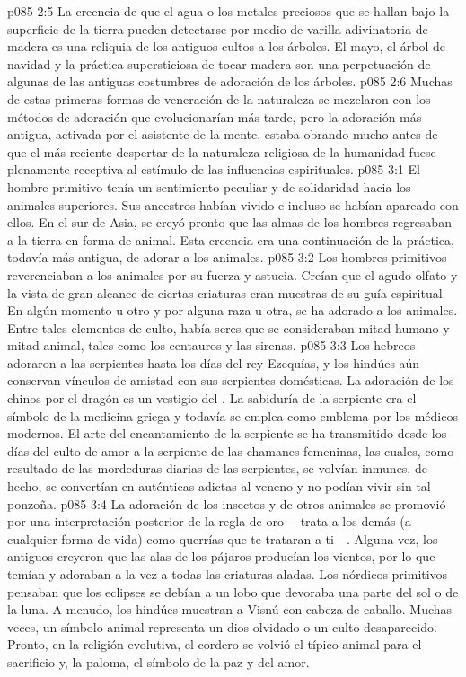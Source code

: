 \vs p085 2:5 La creencia de que el agua o los metales preciosos que se hallan bajo la superficie de la tierra pueden detectarse por medio de varilla adivinatoria de madera es una reliquia de los antiguos cultos a los árboles. El mayo, el árbol de navidad y la práctica supersticiosa de tocar madera son una perpetuación de algunas de las antiguas costumbres de adoración de los árboles.
\vs p085 2:6 Muchas de estas primeras formas de veneración de la naturaleza se mezclaron con los métodos de adoración que evolucionarían más tarde, pero la adoración más antigua, activada por el asistente de la mente, estaba obrando mucho antes de que el más reciente despertar de la naturaleza religiosa de la humanidad fuese plenamente receptiva al estímulo de las influencias espirituales.
\vs p085 3:1 El hombre primitivo tenía un sentimiento peculiar y de solidaridad hacia los animales superiores. Sus ancestros habían vivido e incluso se habían apareado con ellos. En el sur de Asia, se creyó pronto que las almas de los hombres regresaban a la tierra en forma de animal. Esta creencia era una continuación de la práctica, todavía más antigua, de adorar a los animales.
\vs p085 3:2 Los hombres primitivos reverenciaban a los animales por su fuerza y astucia. Creían que el agudo olfato y la vista de gran alcance de ciertas criaturas eran muestras de su guía espiritual. En algún momento u otro y por alguna raza u otra, se ha adorado a los animales. Entre tales elementos de culto, había seres que se consideraban mitad humano y mitad animal, tales como los centauros y las sirenas.
\vs p085 3:3 Los hebreos adoraron a las serpientes hasta los días del rey Ezequías, y los hindúes aún conservan vínculos de amistad con sus serpientes domésticas. La adoración de los chinos por el dragón es un vestigio del . La sabiduría de la serpiente era el símbolo de la medicina griega y todavía se emplea como emblema por los médicos modernos. El arte del encantamiento de la serpiente se ha transmitido desde los días del culto de amor a la serpiente de las chamanes femeninas, las cuales, como resultado de las mordeduras diarias de las serpientes, se volvían inmunes, de hecho, se convertían en auténticas adictas al veneno y no podían vivir sin tal ponzoña.
\vs p085 3:4 La adoración de los insectos y de otros animales se promovió por una interpretación posterior de la regla de oro ---trata a los demás (a cualquier forma de vida) como querrías que te trataran a ti---. Alguna vez, los antiguos creyeron que las alas de los pájaros producían los vientos, por lo que temían y adoraban a la vez a todas las criaturas aladas. Los nórdicos primitivos pensaban que los eclipses se debían a un lobo que devoraba una parte del sol o de la luna. A menudo, los hindúes muestran a Visnú con cabeza de caballo. Muchas veces, un símbolo animal representa un dios olvidado o un culto desaparecido. Pronto, en la religión evolutiva, el cordero se volvió el típico animal para el sacrificio y, la paloma, el símbolo de la paz y del amor.
